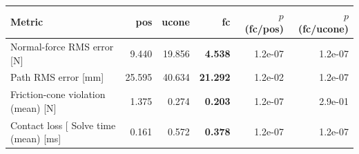\begin{tabular}{lrrrrr}
\toprule
Metric & pos & ucone & \textbf{fc} & $p$ (fc/pos) & $p$ (fc/ucone) \\
\midrule
Normal-force RMS error [N] & 9.440 & 19.856 & \textbf{4.538} & 1.2e-07 & 1.2e-07 \\
Path RMS error [mm] & 25.595 & 40.634 & \textbf{21.292} & 1.2e-02 & 1.2e-07 \\
Friction-cone violation (mean) [N] & 1.375 & 0.274 & \textbf{0.203} & 1.2e-07 & 2.9e-01 \\
Contact loss [%
Solve time (mean) [ms] & 0.161 & 0.572 & \textbf{0.378} & 1.2e-07 & 1.2e-07 \\
\bottomrule
\end{tabular}
